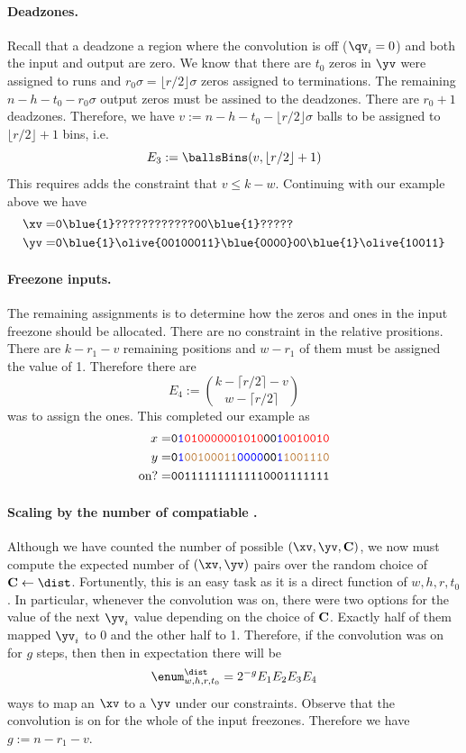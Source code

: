 \paragraph{Deadzones.} Recall that a deadzone a region where the convolution is off ($\qv_i=0$) and both the input and output are zero. We know that there are $t_0$ zeros in $\yv$ were assigned to runs and $r_0\sigma=\lfloor r/2\rfloor\sigma$ zeros assigned to terminations. The remaining $n-h-t_0-r_0\sigma$ output zeros must be assined to the deadzones. There are $r_0+1$ deadzones. Therefore, we have
$v:=n-h-t_0-\lfloor r/2\rfloor\sigma$ balls to be assigned to $\lfloor r/2\rfloor+1$ bins, i.e.
$$
E_3:= \ballsBins(v,\lfloor r/2\rfloor+1)
$$
This requires adds the constraint that $v\leq k-w$.
Continuing with our example above we have
\begin{align*}
    \xv=&\texttt{0\blue{1}????????????00\blue{1}?????}\\
    \yv=&\texttt{0\blue{1}\olive{00100011}\blue{0000}00\blue{1}\olive{10011}}
\end{align*}


\paragraph{Freezone inputs.} The remaining assignments is to determine how the zeros and ones in the input freezone should be allocated. There are no constraint in the relative prositions. There are $k-r_1-v$ remaining positions and $w-r_1$ of them must be assigned the value of 1. Therefore there are
$$
E_4:=\binom{k-\lceil r/2\rceil-v}{w-\lceil r/2\rceil}
$$
was to assign the ones. This completed our example as
\begin{align*}
    x= & \texttt{0\textcolor{blue}{1}\textcolor{red}{010000001010}00\textcolor{blue}{1}\textcolor{red}{0010010}}\\
    y= & \texttt{0\textcolor{blue}{1}\textcolor{brown}{00100011}\textcolor{blue}{0000}00\textcolor{blue}{1}\textcolor{brown}{1001110}}\\
    \text{on?}= & \texttt{001111111111110001111111}
\end{align*}


\paragraph{Scaling by the number of compatiable \C.} Although we have counted the number of possible $(\xv,\yv,\C)$, we now must compute the expected number of $(\xv,\yv)$ pairs over the random choice of $\C\gets \dist$. Fortunently, this is an easy task as it is a direct function of $w,h,r,t_0$. In particular, whenever the convolution was on, there were two options for the value of the next $\yv_i$ value depending on the choice of $\mathbf C$. Exactly half of them mapped $\yv_i$ to 0 and the other half to 1. Therefore, if the convolution was on for $g$ steps, then then in expectation there will be
$$
\enum^\dist_{w,h,r,t_0}=2^{-g}E_1E_2E_3E_4
$$
ways to map an $\xv$ to a $\yv$ under our constraints. Observe that the convolution is on for the whole of the input freezones. Therefore we have $g:=n-r_1-v$.



